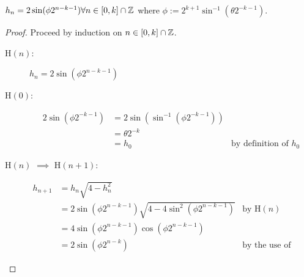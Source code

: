 \begin{Geo Trig Prop 1}
\label{THM_"Geo Trig Prop 1"}
\(h_n = 2\sin(\phi2^{n-k-1}) \forall n \in [0, k] \cap \mathbb{Z}\) where \(\phi := 2^{k+1}\sin^{-1}(\theta2^{-k-1})\).
\end{Geo Trig Prop 1}
\begin{proof}
Proceed by induction on \(n \in [0, k]\cap\mathbb{Z}\).\\
\begin{description}
\item [\textrm{H\((n)\):}] \(h_n = 2\sin(\phi2^{n-k-1})\)
\item [\textrm{H\((0)\):}] 
	\begin{displaymath}
		\begin{align*}
			2\sin(\phi2^{-k-1}) &= 2\sin(\sin^{-1}(\phi2^{-k-1}))\\
								&= \theta2^{-k}\\
								&= h_0 & \textrm{by definition of } h_0
		\end{align*}
	\end{displaymath}
\item [\textrm{H\((n)\) \(\implies\) H\((n+1)\):}]
	\begin{displaymath}
		\begin{align*}
			h_{n+1} &= h_n\sqrt{4-h_n^2}\\
					&= 2\sin(\phi2^{n-k-1})\sqrt{4-4\sin^2(\phi2^{n-k-1})}
						&\textrm{by H\((n)\)}\\
					&= 4\sin(\phi2^{n-k-1})\cos(\phi2^{n-k-1})\\
					&= 2\sin(\phi2^{n-k})
						&\textrm{by the use of double angle formulas}
		\end{align*}
	\end{displaymath}
\end{description}
\end{proof}

